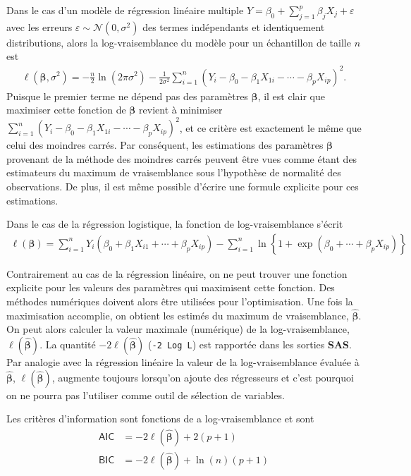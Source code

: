 \documentclass[
  11pt,
  letterpaper,
]{book}
\theoremstyle{definition}
\theoremstyle{definition}
\theoremstyle{definition}
\theoremstyle{remark}
\begin{document}
Dans le cas d'un modèle de régression linéaire multiple \(Y = \beta_0 + \sum_{j=1}^p \beta_jX_j + \varepsilon\) avec les erreurs \(\varepsilon\sim \mathcal{N}(0, \sigma^2)\) des termes indépendants et identiquement distributions, alors la log-vraisemblance du modèle pour un échantillon de taille \(n\) est
\begin{align*}
 \ell(\boldsymbol{\beta}, \sigma^2) =- \frac{n}{2} \ln(2\pi\sigma^2) - \frac{1}{2\sigma^2}\sum_{i=1}^n (Y_i- \beta_0 - \beta_1 X_{1i} - \cdots - \beta_pX_{ip})^2.
\end{align*}
Puisque le premier terme ne dépend pas des paramètres \(\boldsymbol{\beta}\), il est clair que maximiser cette fonction de \(\boldsymbol{\beta}\) revient à minimiser \(\sum_{i=1}^n (Y_i- \beta_0 - \beta_1 X_{1i} - \cdots - \beta_pX_{ip})^2\), et ce critère est exactement le même que celui des moindres carrés. Par conséquent, les estimations des paramètres \(\boldsymbol{\beta}\) provenant de la méthode des moindres carrés peuvent être vues comme étant des estimateurs du maximum de vraisemblance sous l'hypothèse de normalité des observations. De plus, il est même possible d'écrire une formule explicite pour ces estimations.

Dans le cas de la régression logistique, la fonction de log-vraisemblance s'écrit
\begin{align*}
 \ell(\boldsymbol{\beta}) = \sum_{i=1}^n Y_i ( \beta_0 + \beta_1 X_{i1} + \cdots + \beta_p X_{ip}) - \sum_{i=1}^n \ln\left\{1+\exp(\beta_0 + \cdots + \beta_pX_{ip})\right\}
\end{align*}

Contrairement au cas de la régression linéaire, on ne peut trouver une fonction explicite pour les valeurs des paramètres qui maximisent cette fonction. Des méthodes numériques doivent alors être utilisées pour l'optimisation. Une fois la maximisation accomplie, on obtient les estimés du maximum de vraisemblance, \(\widehat{\boldsymbol{\beta}}\). On peut alors calculer la valeur maximale (numérique) de la log-vraisemblance, \(\ell(\widehat{\boldsymbol{\beta}})\). La quantité \(-2\ell(\widehat{\boldsymbol{\beta}})\) (\texttt{-2\ Log\ L}) est rapportée dans les sorties \textbf{SAS}. Par analogie avec la régression linéaire la valeur de la log-vraisemblance évaluée à \(\widehat{\boldsymbol{\beta}}\), \(\ell(\widehat{\boldsymbol{\beta}})\), augmente toujours lorsqu'on ajoute des régresseurs et c'est pourquoi on ne pourra pas l'utiliser comme outil de sélection de variables.

Les critères d'information sont fonctions de a log-vraisemblance et sont
\begin{align*}
 \mathsf{AIC} & = -2 \ell(\widehat{\boldsymbol{\beta}}) + 2(p+1)\\
 \mathsf{BIC} & = -2 \ell(\widehat{\boldsymbol{\beta}}) + \ln(n)(p+1)
\end{align*}
\end{document}
